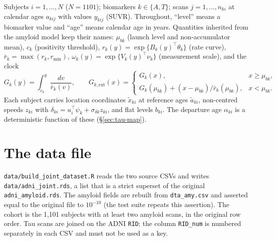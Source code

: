 \documentclass[11pt]{article}
\newcommand{\code}[1]{\texttt{#1}}
\newcommand{\rbar}{\bar r}
\begin{document}
Subjects $i=1,\dots,N$ ($N=1101$); biomarkers $k\in\{A,T\}$; scans
$j=1,\dots,n_{ki}$ at calendar ages $a_{kij}$ with values $y_{kij}$ (SUVR).
Throughout, ``level'' means a biomarker value and ``age'' means calendar age in
years. Quantities inherited from the amyloid model keep their names:
$\mu_{bk}$ (launch level and non-accumulator mean), $c_k$ (positivity threshold),
$r_k(y)=\exp\{B_k(y)^\top\theta_k\}$ (rate curve), $\rbar_k=\max(r_k,r_{\min})$,
$\omega_k(y)=\exp\{V_k(y)^\top\nu_k\}$ (measurement scale), and the clock
\begin{equation}
G_k(y)=\int_{c_k}^{y}\frac{dv}{\rbar_k(v)},\qquad
G_{k,\mathrm{ext}}(x)=\begin{cases}G_k(x), & x\ge\mu_{bk},\\
G_k(\mu_{bk})+(x-\mu_{bk})/\rbar_k(\mu_{bk}), & x<\mu_{bk}.\end{cases}
\label{eq:clock}
\end{equation}
Each subject carries location coordinates $\tilde x_{ki}$ at reference ages
$\tilde a_{ki}$, non-centred speeds $z_{ki}$ with $\delta_{ki}=u_i^\top\psi_k+\sigma_{\delta k}z_{ki}$,
and flat levels $b_{ki}$. The departure age $\alpha_{ki}$ is a deterministic
function of these (\S\ref{sec:tau-map}).

\section{The data file}\label{sec:data}

\code{data/build\_joint\_dataset.R} reads the two source CSVs and writes
\code{data/adni\_joint.rds}, a list that is a strict superset of the original
\code{adni\_amyloid.rds}. The amyloid fields are rebuilt from \code{dta\_amy.csv}
and asserted equal to the original file to $10^{-10}$ (the test suite repeats this
assertion). The cohort is the 1{,}101 subjects with at least two amyloid scans, in
the original row order. Tau scans are joined on the ADNI \code{RID}; the column
\code{RID\_num} is numbered separately in each CSV and must not be used as a key.
\end{document}
